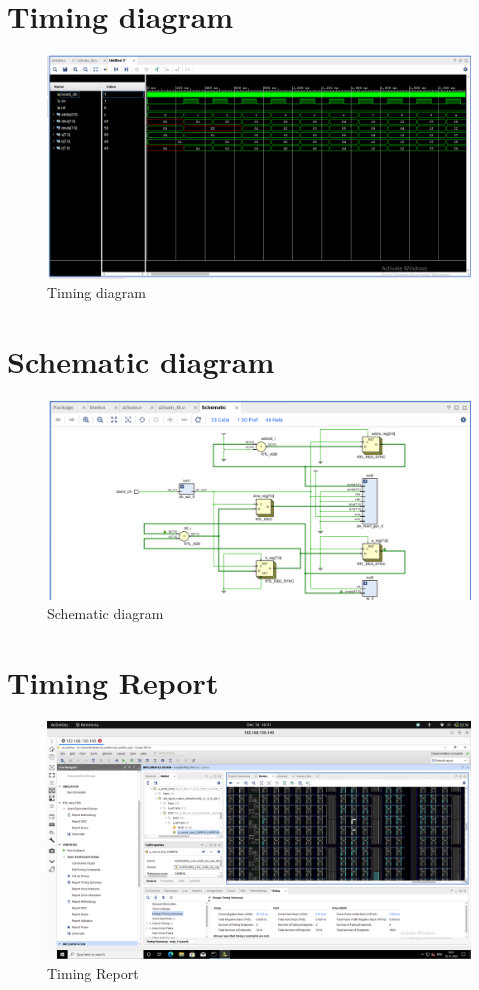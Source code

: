 \documentclass{article}
\begin{document}
\section{Timing diagram}
\begin{figure}[h]
    \centering
\includegraphics[width=\columnwidth]{diag/simulated.png}
    \caption{Timing diagram}
    \label{fig:my_label}
\end{figure}
\vspace{10cm}

\section{Schematic diagram}
\begin{figure}[h]
    \centering
\includegraphics[width=\columnwidth]{diag/schematic.png}
    \caption{Schematic diagram}
    \label{fig:my_label}
\end{figure}
\vspace{10cm}


\section{Timing Report}
\begin{figure}[h]
    \centering
\includegraphics[width=\columnwidth]{diag/timing.png}
    \caption{Timing Report}
    \label{fig:my_label}
\end{figure}
\end{document}
